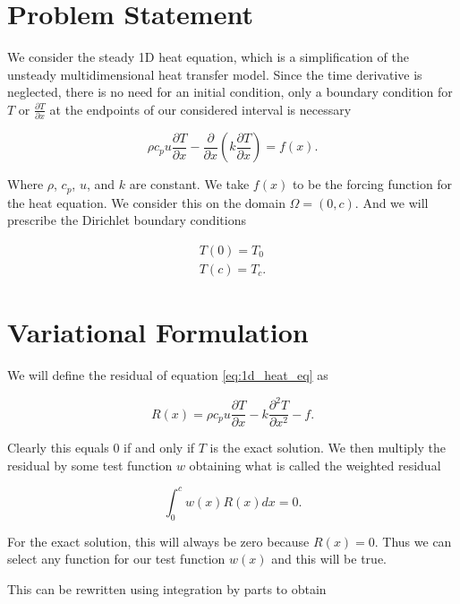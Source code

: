 \documentclass[10pt]{amsart}
\numberwithin{equation}{section}
\theoremstyle{definition}
\newcommand{\pder}[2][]{\frac{\partial#1}{\partial#2}}
\newcommand{\spder}[2][]{\frac{\partial^2 #1}{\partial#2^2}}
\begin{document}
\begin{multicols}{2}
  \section{Problem Statement}%
  \label{sec:problem_statement}

  We consider the steady 1D heat equation, which is a simplification of the
  unsteady multidimensional heat transfer model. Since the time derivative is
  neglected, there is no need for an initial condition, only a boundary condition
  for $T$ or $\pder[T]{x}$ at the endpoints of our considered interval is
  necessary

  \begin{equation}\label{eq:1d_heat_eq}
    \rho c_p u \pder[T]{x}-\pder{x}\left(k\pder[T]{x}\right)=f(x).
  \end{equation}

  Where $\rho$, $c_p$, $u$, and $k$ are constant. We take $f(x)$ to be the
  forcing function for the heat equation. We consider this on the domain
  $\Omega=(0,c)$. And we will prescribe the Dirichlet boundary conditions

  \begin{align*}
    T(0) = T_0\\
    T(c) = T_c.
  \end{align*}

  \section{Variational Formulation}%
  \label{sec:variational_formulation}

  We will define the residual of equation \eqref{eq:1d_heat_eq} as

  \begin{equation*}
    R(x) = \rho c_p u\pder[T]{x}-k\spder[T]{x}-f.
  \end{equation*}

  Clearly this equals $0$ if and only if $T$ is the exact solution. We then
  multiply the residual by some test function $w$ obtaining what is called the
  weighted residual

  \begin{equation*}
    \int_0^cw(x)R(x)dx=0.
  \end{equation*}

  For the exact solution, this will always be zero because $R(x)=0$. Thus we
  can select any function for our test function $w(x)$ and this will be true.

  This can be rewritten using integration by parts to obtain


\end{multicols}
\end{document}
